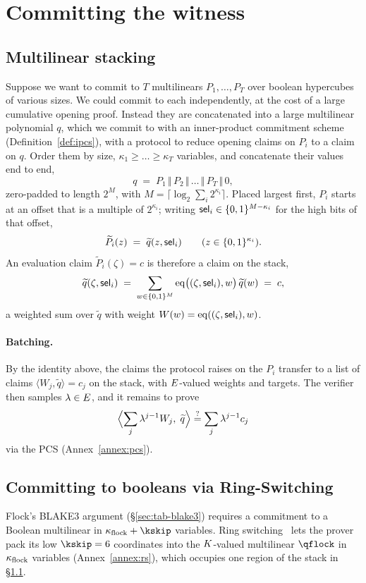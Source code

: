\section{Committing the witness}\label{sec:rs}

\subsection{Multilinear stacking}\label{sec:stacking}

Suppose we want to commit to $T$ multilinears $P_1,\dots,P_T$ over boolean hypercubes of various sizes. We could commit to each independently, at the cost of a large cumulative opening proof. Instead they are concatenated into a large multilinear polynomial $q$, which we commit to with an inner-product commitment scheme (Definition~\ref{def:ipcs}), with a protocol to reduce opening claims on $P_i$ to a claim on $q$. Order them by size, $\kappa_1\ge\dots\ge\kappa_T$ variables, and concatenate their values end to end,
\[
  q \;=\; P_1 \,\Vert\, P_2 \,\Vert\,\dots\,\Vert\, P_T \,\Vert\, 0,
\]
zero-padded to length $2^{M}$, with $M=\bigl\lceil\log_2\textstyle\sum_i 2^{\kappa_i}\bigr\rceil$. Placed largest first, $P_i$ starts at an offset that is a multiple of $2^{\kappa_i}$; writing $\mathsf{sel}_i\in\{0,1\}^{M-\kappa_i}$ for the high bits of that offset,
\[
  \widetilde P_i(z)\;=\;\widetilde q(z,\mathsf{sel}_i)\qquad(z\in\{0,1\}^{\kappa_i}).
\]
An evaluation claim $\widetilde P_i(\zeta)=c$ is therefore a claim on the stack,
\[
  \widetilde q(\zeta,\mathsf{sel}_i)\;=\;\sum_{w\in\{0,1\}^{M}}\operatorname{eq}\bigl((\zeta,\mathsf{sel}_i),w\bigr)\,\widetilde q(w)\;=\;c,
\]
a weighted sum over $\widetilde q$ with weight $W(w)=\operatorname{eq}((\zeta,\mathsf{sel}_i),w)$.

\paragraph{Batching.} By the identity above, the claims the protocol raises on the $P_i$ transfer to a list of claims $\langle W_j,\widetilde q\rangle=c_j$ on the stack, with $E$-valued weights and targets. The verifier then samples $\lambda\in E$, and it remains to prove
\[
  \Bigl\langle \sum_j\lambda^{j-1}W_j,\;\widetilde q\Bigr\rangle\stackrel{?}{=}\sum_j\lambda^{j-1}c_j
\]
via the PCS (Annex~\ref{annex:pcs}).

\subsection{Committing to booleans via Ring-Switching}\label{sec:ringswitch}

Flock's BLAKE3 argument (\S\ref{sec:tab-blake3}) requires a commitment to a Boolean multilinear in $\nflock+\kskip$ variables. Ring switching~\cite{DP26} lets the prover pack its low $\kskip=6$ coordinates into the $K$-valued multilinear $\qflock$ in $\kappa_{\mathrm{flock}}$ variables (Annex~\ref{annex:rs}), which occupies one region of the stack in \S\ref{sec:stacking}.
